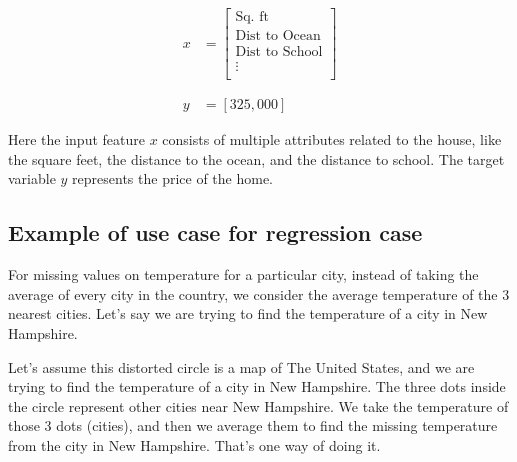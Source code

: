 \vspace{-0.5cm}

\begin{align*}
    x &= \begin{bmatrix}
            \text{Sq. ft} \\
            \text{Dist to Ocean} \\
            \text{Dist to School} \\
            \vdots \\
         \end{bmatrix} \\\\\\
    y &= [325,000]
\end{align*}

Here the input feature $x$ consists of multiple attributes related to the house,
like the  square feet, the distance to the ocean, and the distance to school. The target
variable $y$ represents the price of the home.

\subsection{Example of use case for regression case}

For missing values on temperature for a particular city, instead of
taking the average of every city in the country, we consider the average
temperature of the 3 nearest cities. Let's say we are trying to find the temperature
of a city in New Hampshire.

\begin{center}
\end{center}

Let's assume this distorted circle is a map of The United States, and we are trying
to find the temperature of a city in New Hampshire. The three dots inside the circle
represent other cities near New Hampshire. We take the temperature of those 3 dots (cities),
and then we average them to find the missing temperature from the city in New Hampshire. That's one
way of doing it.


